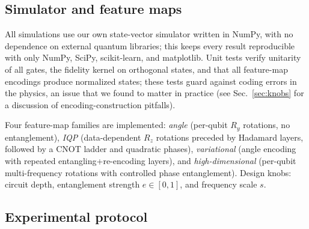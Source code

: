 \documentclass[aps,pra,preprint]{revtex4-2}
\begin{document}
\subsection{Simulator and feature maps}
\label{sec:methods-sim}

All simulations use our own state-vector simulator written in NumPy, with no dependence on
external quantum libraries; this keeps every result reproducible with only NumPy,
SciPy, scikit-learn, and matplotlib. Unit tests verify unitarity of all gates, the
fidelity kernel on orthogonal states, and that all feature-map encodings produce
normalized states; these tests guard against coding errors in the physics, an issue that
we found to matter in practice (see Sec.~\ref{sec:knobs} for a discussion of
encoding-construction pitfalls).

Four feature-map families are implemented:
\emph{angle} (per-qubit $R_y$ rotations, no entanglement), \emph{IQP} (data-dependent
$R_z$ rotations preceded by Hadamard layers, followed by a CNOT ladder and quadratic
phases), \emph{variational} (angle encoding with repeated entangling+re-encoding layers),
and \emph{high-dimensional} (per-qubit multi-frequency rotations with controlled phase
entanglement). Design knobs: circuit depth, entanglement strength $e\in[0,1]$, and
frequency scale $s$.

\subsection{Experimental protocol}
\label{sec:methods-protocol}
\end{document}
